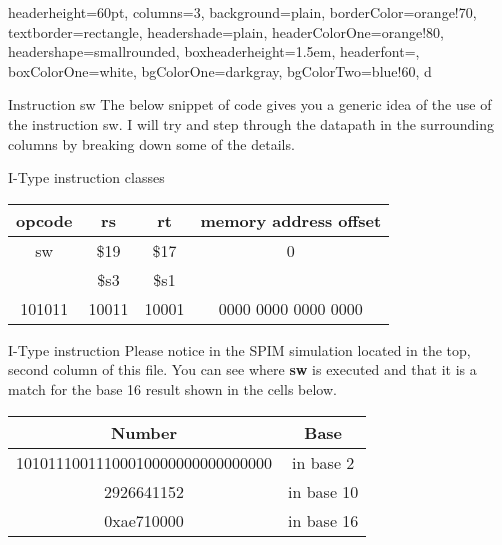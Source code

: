 \documentclass[landscape,fontscale=1,margin=0.2cm,paperwidth=50truecm, paperheight=34truecm,debug]{baposter}
\begin{document}
\begin{poster}{
  headerheight=60pt,
  columns=3,
  background=plain,
  borderColor=orange!70,
  textborder=rectangle,
  headershade=plain,
  headerColorOne=orange!80,
  headershape=smallrounded,
  boxheaderheight=1.5em,
  headerfont={},
  boxColorOne=white,
  bgColorOne=darkgray,
  bgColorTwo=blue!60,
}{}{\Large{\color{white}{Single Cycle Datapath with MIPS instruction sw}}}{}{d}

\begin{posterbox}[column=0]{Instruction sw}
The below snippet of code gives you a generic idea of the use of the instruction sw. I will try and step through the datapath in the surrounding columns by breaking down some of the details. 
\begin{center}
\lstset{language=[mips]Assembler}

\end{center}
\end{posterbox}
\begin{posterbox}[column=0,below=auto,textborder=rounded]{I-Type instruction classes}
\begin{center}
\begin{tabular}{|c|c|c|c|}
\hline
opcode & rs & rt & memory address offset\\\hline\hline
sw & \$19 & \$17 & 0\\\hline
& \$s3 & \$s1&\\\hline
101011 & 10011 & 10001 & 0000 0000 0000 0000\\\hline
\end{tabular}
\end{center}
\end{posterbox}
\begin{posterbox}[column=0,below=auto,textborder=rounded]{I-Type instruction}
Please notice in the SPIM simulation located in the top, second column of this file. You can see where \textbf{sw} is executed and that it is a match for the base 16 result shown in the cells below. 
\begin{center}
\begin{tabular}{|c|c|}
\hline
Number & Base\\\hline
10101110011100010000000000000000 & in base 2\\\hline
2926641152 & in base 10\\\hline
0xae710000 & in base 16\\\hline
\end{tabular}


\end{center}
\end{posterbox}
\end{poster}
\end{document}
